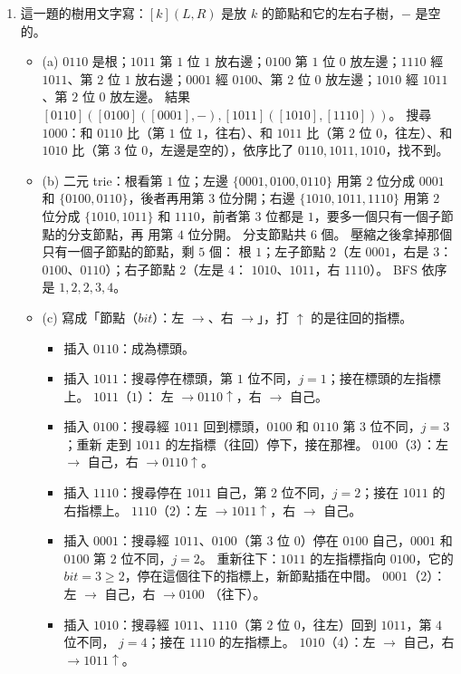 \begin{enumerate}
\item 這一題的樹用文字寫：$[k](L, R)$ 是放 $k$ 的節點和它的左右子樹，$-$ 是空的。
\begin{itemize}
\item (a) $0110$ 是根；$1011$ 第 $1$ 位 $1$ 放右邊；$0100$ 第 $1$ 位 $0$ 放左邊；$1110$ 經
$1011$、第 $2$ 位 $1$ 放右邊；$0001$ 經 $0100$、第 $2$ 位 $0$ 放左邊；$1010$ 經 $1011$、第
$2$ 位 $0$ 放左邊。 結果 $[0110]([0100]([0001], -), [1011]([1010], [1110]))$。 搜尋
$1000$：和 $0110$ 比（第 $1$ 位 $1$，往右）、和 $1011$ 比（第 $2$ 位 $0$，往左）、和
$1010$ 比（第 $3$ 位 $0$，左邊是空的），依序比了 $0110, 1011, 1010$，找不到。
\item (b) 二元 trie：根看第 $1$ 位；左邊 $\{0001, 0100, 0110\}$ 用第 $2$ 位分成 $0001$ 和
$\{0100, 0110\}$，後者再用第 $3$ 位分開；右邊 $\{1010, 1011, 1110\}$ 用第 $2$ 位分成
$\{1010, 1011\}$ 和 $1110$，前者第 $3$ 位都是 $1$，要多一個只有一個子節點的分支節點，再
用第 $4$ 位分開。 分支節點共 $6$ 個。 壓縮之後拿掉那個只有一個子節點的節點，剩 $5$ 個：
根 $1$；左子節點 $2$（左 $0001$，右是 $3$：$0100$、$0110$）；右子節點 $2$（左是 $4$：
$1010$、$1011$，右 $1110$）。 BFS 依序是 $1, 2, 2, 3, 4$。
\item (c) 寫成「節點（$\mathit{bit}$）：左 $\to$、右 $\to$」，打 $\uparrow$ 的是往回的指標。
\begin{itemize}
\item 插入 $0110$：成為標頭。
\item 插入 $1011$：搜尋停在標頭，第 $1$ 位不同，$j = 1$；接在標頭的左指標上。 $1011$（$1$）：
左 $\to 0110\uparrow$，右 $\to$ 自己。
\item 插入 $0100$：搜尋經 $1011$ 回到標頭，$0100$ 和 $0110$ 第 $3$ 位不同，$j = 3$；重新
走到 $1011$ 的左指標（往回）停下，接在那裡。 $0100$（$3$）：左 $\to$ 自己，右 $\to 0110\uparrow$。
\item 插入 $1110$：搜尋停在 $1011$ 自己，第 $2$ 位不同，$j = 2$；接在 $1011$ 的右指標上。
$1110$（$2$）：左 $\to 1011\uparrow$，右 $\to$ 自己。
\item 插入 $0001$：搜尋經 $1011$、$0100$（第 $3$ 位 $0$）停在 $0100$ 自己，$0001$ 和
$0100$ 第 $2$ 位不同，$j = 2$。 重新往下：$1011$ 的左指標指向 $0100$，它的 $\mathit{bit} = 3
\ge 2$，停在這個往下的指標上，新節點插在中間。 $0001$（$2$）：左 $\to$ 自己，右 $\to 0100$
（往下）。
\item 插入 $1010$：搜尋經 $1011$、$1110$（第 $2$ 位 $0$，往左）回到 $1011$，第 $4$ 位不同，
$j = 4$；接在 $1110$ 的左指標上。 $1010$（$4$）：左 $\to$ 自己，右 $\to 1011\uparrow$。
\end{itemize}

\end{itemize}
\end{enumerate}
